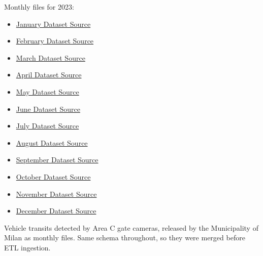 \documentclass{article}
\begin{document}
	Monthly files for 2023:
	\begin{itemize}
		\item \href{https://dati.comune.milano.it/dataset/ds2212_area-c-accessi-mensili-gennaio-2023}{January Dataset Source}
		\item \href{https://dati.comune.milano.it/dataset/ds2236_area-c-accessi-mensili-febbraio-2023}{February Dataset Source}
		\item \href{https://dati.comune.milano.it/dataset/ds2272_area-c-accessi-mensili-marzo-2023}{March Dataset Source}
		\item \href{https://dati.comune.milano.it/dataset/ds2327_area-c-accessi-mensili-aprile-2023}{April Dataset Source}
		\item \href{https://dati.comune.milano.it/dataset/ds2372_area-c-accessi-mensili-maggio-2023}{May Dataset Source}
		\item \href{https://dati.comune.milano.it/dataset/ds2397_area-c-accessi-mensili-giugno-2023}{June Dataset Source}
		\item \href{https://dati.comune.milano.it/dataset/ds2432_area-c-accessi-mensili-luglio-2023}{July Dataset Source}
		\item \href{https://dati.comune.milano.it/dataset/ds2434_area-c-accessi-mensili-agosto-2023}{August Dataset Source}
		\item \href{https://dati.comune.milano.it/dataset/ds2482_area-c-accessi-mensili-settembre-2023}{September Dataset Source}
		\item \href{https://dati.comune.milano.it/dataset/ds2633_area-c-accessi-mensili-ottobre-2023}{October Dataset Source}
		\item \href{https://dati.comune.milano.it/dataset/ds2664_area-c-accessi-mensili-novembre-2023}{November Dataset Source}
		\item \href{https://dati.comune.milano.it/dataset/ds2682_area-c-accessi-mensili-dicembre-2023}{December Dataset Source}
	\end{itemize}
	
	Vehicle transits detected by Area C gate cameras, released by the Municipality of Milan as monthly files. Same schema throughout, so they were merged before ETL ingestion.
	
\end{document}
